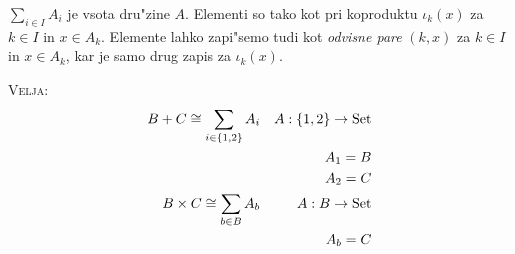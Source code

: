 $\sum_{i \in I} A_i$ je vsota dru"zine $A$. Elementi so tako kot pri koproduktu $\iota_k(x)$ za $k \in I$ in $x \in A_k$. Elemente lahko zapi"semo tudi kot \emph{odvisne pare} $(k, x)$ za $k \in I$ in $x \in A_k$, kar je samo drug zapis za $\iota_k(x)$.

\textsc{Velja:}
\begin{align*}
B + C \cong \sum_{i \in \{1, 2\}} A_i && A: \{1, 2\} \rightarrow \text{Set}\\
&& A_1 = B \\
&& A_2 = C \\
B \times C \cong \sum_{b \in B} A_b && A: B \rightarrow \text{Set} \\
&& A_b = C
\end{align*}